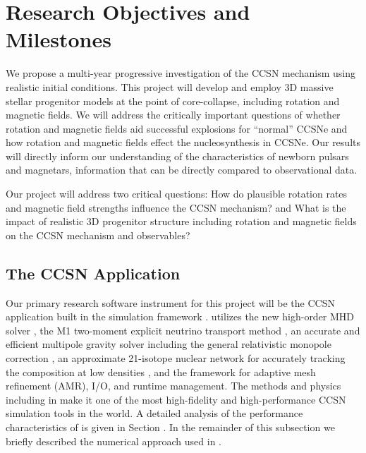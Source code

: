 \section{Research Objectives and Milestones}
\label{sec:objectives}

We propose a multi-year progressive investigation of the CCSN mechanism using realistic initial conditions.
This project will develop and employ 3D massive stellar progenitor models at the point of core-collapse, including rotation and magnetic fields.
We will address the critically important questions of whether rotation and magnetic fields aid successful explosions for ``normal'' CCSNe and how rotation and magnetic fields effect the nucleosynthesis in CCSNe.
Our results will directly inform our understanding of the characteristics of newborn pulsars and magnetars, information that can be directly compared to observational data.

Our project will address two critical questions: How do plausible rotation rates and magnetic field strengths influence the CCSN mechanism? and What is the impact of realistic 3D progenitor structure including rotation and magnetic fields on the CCSN mechanism and observables?

\subsection{The \sparkmone CCSN Application}
\label{sec:spark}

Our primary research software instrument for this project will be the \sparkmone CCSN application built in the \flash simulation framework \citep{Fryxell:2000, Dubey:2009}.
\sparkmone utilizes the new \spark high-order MHD solver \citep{Couch:2017}, the M1 two-moment explicit neutrino transport method \citep{Shibata:2011a, OConnor:2015, OConnor:2015a}, an accurate and efficient multipole gravity solver \citep{Couch:2013c} including the general relativistic monopole correction \citep{Marek:2006}, an approximate 21-isotope nuclear network for accurately tracking the composition at low densities \citep{Couch:2015a}, and the \flash framework for adaptive mesh refinement (AMR), I/O, and runtime management.
The methods and physics including in \sparkmone make it one of the most high-fidelity and high-performance CCSN simulation tools in the world.
A detailed analysis of the performance characteristics of \sparkmone is given in Section .
In the remainder of this subsection we briefly described the numerical approach used in \sparkmone.

